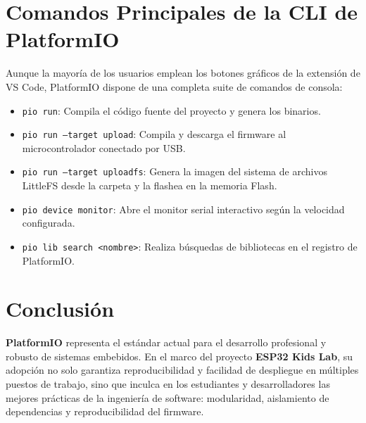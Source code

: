 \documentclass[12pt,a4paper]{article}
\begin{document}
\section{Comandos Principales de la CLI de PlatformIO}

Aunque la mayoría de los usuarios emplean los botones gráficos de la extensión de VS Code, PlatformIO dispone de una completa suite de comandos de consola:

\begin{itemize}
    \item \texttt{pio run}: Compila el código fuente del proyecto y genera los binarios.
    \item \texttt{pio run --target upload}: Compila y descarga el firmware al microcontrolador conectado por USB.
    \item \texttt{pio run --target uploadfs}: Genera la imagen del sistema de archivos LittleFS desde la carpeta  y la flashea en la memoria Flash.
    \item \texttt{pio device monitor}: Abre el monitor serial interactivo según la velocidad configurada.
    \item \texttt{pio lib search <nombre>}: Realiza búsquedas de bibliotecas en el registro de PlatformIO.
\end{itemize}

\section{Conclusión}

\textbf{PlatformIO} representa el estándar actual para el desarrollo profesional y robusto de sistemas embebidos. En el marco del proyecto \textbf{ESP32 Kids Lab}, su adopción no solo garantiza reproducibilidad y facilidad de despliegue en múltiples puestos de trabajo, sino que inculca en los estudiantes y desarrolladores las mejores prácticas de la ingeniería de software: modularidad, aislamiento de dependencias y reproducibilidad del firmware.
\end{document}
